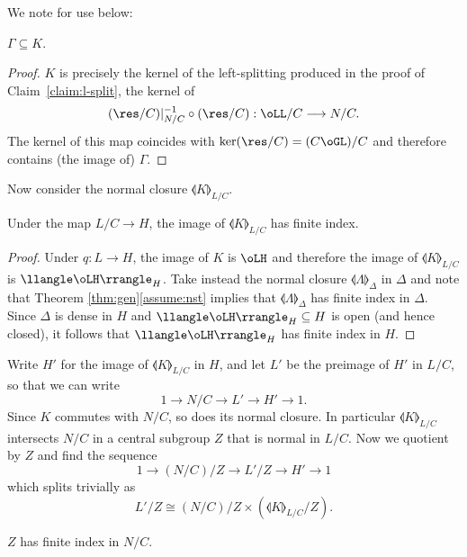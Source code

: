 We note for use below:
\begin{claim}\label{claim:Gamma-subset-K}
$\Gamma\subseteq K$.
\end{claim}
\begin{proof} $K$ is precisely the kernel of the left-splitting produced in the proof of Claim~\ref{claim:l-split}, \ie the kernel of
\[
(\res/C)|_{N/C}^{-1} \circ (\res/C): \oLL/C\longrightarrow N/C.
\]
The kernel of this map coincides with $\ker(\res/C)=(C\oGL)/C$ and therefore contains (the image of) $\Gamma$.\end{proof}
Now consider the normal closure $\llangle K\rrangle_{L/C}$.
\begin{claim} Under the map $L/C\to H$, the image of $\llangle K\rrangle_{L/C}$ has finite index.\end{claim}
\begin{proof} Under $q:L\to H$, the image of $K$ is $\oLH$ and therefore the image of $\llangle K\rrangle_{L/C}$ is $\llangle \oLH\rrangle_H$. Take instead the normal closure $\llangle\Lambda\rrangle_\Delta$ in $\Delta$ and note that Theorem \ref{thm:gen}\eqref{assume:nst} implies that $\llangle \Lambda\rrangle_\Delta$ has finite index in $\Delta$. Since $\Delta$ is dense in $H$ and $\llangle \oLH\rrangle_H\subseteq H$ is open (and hence closed), it follows that $\llangle \oLH\rrangle_H$ has finite index in $H$.\end{proof}
Write $H'$ for the image of $\llangle K\rrangle_{L/C}$ in $H$, and let $L'$ be the preimage of $H'$ in $L/C$, so that we can write
\begin{equation}\label{eq:ses-mod-c}
1\to N/C\to L'\to H'\to 1.
\end{equation}
Since $K$ commutes with $N/C$, so does its normal closure. In particular $\llangle K\rrangle_{L/C}$ intersects $N/C$ in a central subgroup $Z$ that is normal in $L/C$. Now we quotient by $Z$ and find the sequence
\begin{equation}\label{eq:ses-mod-cz}
1\to (N/C)/Z \to L'/Z \to H'\to 1
\end{equation}
which splits trivially as
\[
L'/Z\cong (N/C)/Z \times (\llangle K\rrangle_{L/C} / Z).
\]
\begin{claim}\label{claim:z-nc-fi}
$Z$ has finite index in $N/C$.
\end{claim}
